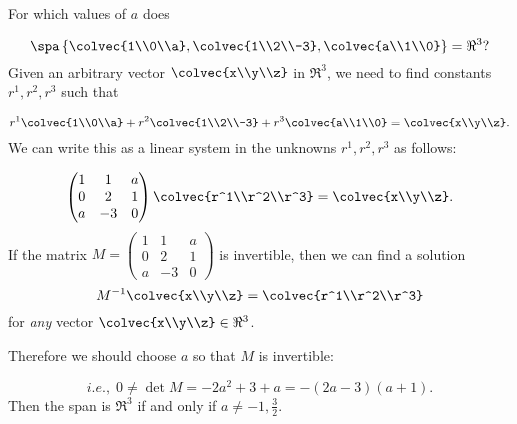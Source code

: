 \begin{example}
For which values of $a$ does

\[
\spa \left\{ \colvec{1\\0\\a} , \colvec{1\\2\\-3} , \colvec{a\\1\\0}   \right\} = \Re^3?
\]
Given an arbitrary vector $\colvec{x\\y\\z}$ in $\Re^3$, we need to find constants $r^1, r^2, r^3$ such that 

\[
r^1 \colvec{1\\0\\a} + r^2\colvec{1\\2\\-3} +r^3 \colvec{a\\1\\0} = \colvec{x\\y\\z}.
\]
We can write this as a linear system in the unknowns $r^1, r^2, r^3$ as follows:

\[
\begin{pmatrix}
1 & 1 & a \\ 
0 & 2 & 1 \\
a & -3 & 0
\end{pmatrix}
\colvec{r^1\\r^2\\r^3}
= \colvec{x\\y\\z}.
\]
If the matrix $M=\begin{pmatrix}
1 & 1 & a \\ 
0 & 2 & 1 \\
a & -3 & 0
\end{pmatrix}$ is invertible, then we can find a solution 
\[
M^{-1}\colvec{x\\y\\z}=\colvec{r^1\\r^2\\r^3}
\]
for \emph{any} vector $\colvec{x\\y\\z} \in \Re^3$.

Therefore we should choose $a$ so that $M$ is invertible:  

\[
i.e.,\;  0 \neq \det M = -2a^2 + 3 + a = -(2a-3)(a+1). 
\]
Then the span is $\Re^3$ if and only if $a \neq -1, \frac{3}{2}$.
\end{example}

